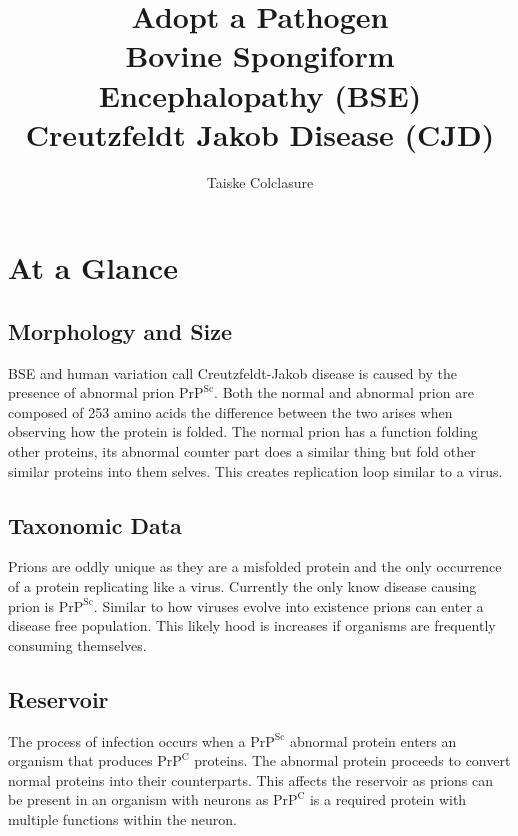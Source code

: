 \documentclass{report}
\title{\Huge{Adopt a Pathogen}\\Bovine Spongiform Encephalopathy (BSE)\\Creutzfeldt Jakob Disease (CJD)}
\author{\huge{Taiske Colclasure}}
\date{}
\begin{document}
\maketitle
\newpage%
\tableofcontents
\pagebreak

\chapter{At a Glance}
\section{Morphology and Size}
BSE and human variation call Creutzfeldt-Jakob disease is caused by the presence of abnormal prion $\text{PrP}^{\text{Sc}}$. Both the normal and abnormal prion are composed of 253 amino acids the difference between the two arises when observing how the protein is folded. The normal prion has a function folding other proteins, its abnormal counter part does a similar thing but fold other similar proteins into them selves. This creates replication loop similar to a virus.



\section{Taxonomic Data}
Prions are oddly unique as they are a misfolded protein and the only occurrence of a protein replicating like a virus. Currently the only know disease causing prion is $\text{PrP}^\text{Sc}$. Similar to how viruses evolve into existence prions can enter a disease free population. This likely hood is increases if organisms are frequently consuming themselves.



\section{Reservoir}
The process of infection occurs when a $\text{PrP}^{\text{Sc}}$ abnormal protein enters an organism that produces $\text{PrP}^{\text{C}}$ proteins. The abnormal protein proceeds to convert normal proteins into their counterparts. This affects the reservoir as prions can be present in an organism with neurons as $\text{PrP}^{\text{C}}$ is a required protein with multiple functions within the neuron.
\end{document}
